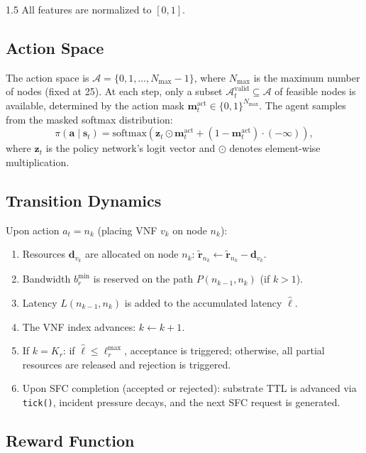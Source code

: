 \documentclass[A4paper,12pt]{report}
\theoremstyle{plain}
\theoremstyle{definition}
\theoremstyle{remark}
\numberwithin{equation}{section}
\begin{document}
\begin{spacing}{1.5}
All features are normalized to $[0, 1]$.

\subsection{Action Space}

The action space is $\mathcal{A} = \{0, 1, \ldots, N_{\max}-1\}$, where $N_{\max}$ is the maximum number of nodes (fixed at 25). At each step, only a subset $\mathcal{A}_t^{\text{valid}} \subseteq \mathcal{A}$ of feasible nodes is available, determined by the action mask $\mathbf{m}_t^{\text{act}} \in \{0,1\}^{N_{\max}}$. The agent samples from the masked softmax distribution:
\begin{equation}
\pi(\mathbf{a} \mid \mathbf{s}_t) = \text{softmax}\!\left(\mathbf{z}_t \odot \mathbf{m}_t^{\text{act}} + (1-\mathbf{m}_t^{\text{act}}) \cdot (-\infty)\right),
\end{equation}
where $\mathbf{z}_t$ is the policy network's logit vector and $\odot$ denotes element-wise multiplication.

\subsection{Transition Dynamics}

Upon action $a_t = n_k$ (placing VNF $v_k$ on node $n_k$):
\begin{enumerate}
  \item Resources $\mathbf{d}_{v_k}$ are allocated on node $n_k$: $\tilde{\mathbf{r}}_{n_k} \leftarrow \tilde{\mathbf{r}}_{n_k} - \mathbf{d}_{v_k}$.
  \item Bandwidth $b_r^{\min}$ is reserved on the path $P(n_{k-1}, n_k)$ (if $k > 1$).
  \item Latency $L(n_{k-1}, n_k)$ is added to the accumulated latency $\hat{\ell}$.
  \item The VNF index advances: $k \leftarrow k+1$.
  \item If $k = K_r$: if $\hat{\ell} \leq \ell_r^{\max}$, acceptance is triggered; otherwise, all partial resources are released and rejection is triggered.
  \item Upon SFC completion (accepted or rejected): substrate TTL is advanced via \texttt{tick()}, incident pressure decays, and the next SFC request is generated.
\end{enumerate}

\subsection{Reward Function}


\end{spacing}
\end{document}
